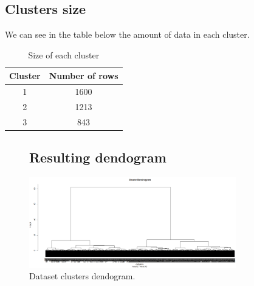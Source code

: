 \newpage
\subsection{Clusters size}

We can see in the table below the amount of data in each cluster.

\begin{table}[h!]
\centering
\begin{tabular}{|c| c|} 
 \hline
 \textbf{Cluster} & \textbf{Number of rows} \\ [0.5ex]
 \hline\hline
 1 & 1600\\
 2 & 1213\\
 3 & 843\\
 \hline
\end{tabular}
\caption{Size of each cluster}
\label{table:1}
\end{table}

\begin{figure}
  \subsection{Resulting dendogram}
  \centering
  \includegraphics[angle = 90, width= 9cm]{images/endograma.png}
  \caption{Dataset clusters dendogram.}
  \label{fig:indiv}
\end{figure}


